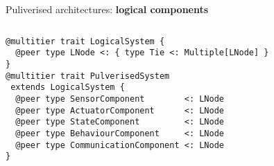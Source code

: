 \begin{frame}[fragile]{Puliverised architectures: \textbf{logical components}}
  \begin{columns}
    \begin{column}{0.55\textwidth}
      \begin{cardTiny}
        \begin{verbatim}
@multitier trait LogicalSystem {
  @peer type LNode <: { type Tie <: Multiple[LNode] }
}
@multitier trait PulverisedSystem 
 extends LogicalSystem {  
  @peer type SensorComponent        <: LNode 
  @peer type ActuatorComponent      <: LNode
  @peer type StateComponent         <: LNode
  @peer type BehaviourComponent     <: LNode
  @peer type CommunicationComponent <: LNode
}
        \end{verbatim}
      \end{cardTiny}
    \end{column}
    \begin{column}{0.45\textwidth}
    \end{column}
  \end{columns}
\end{frame}